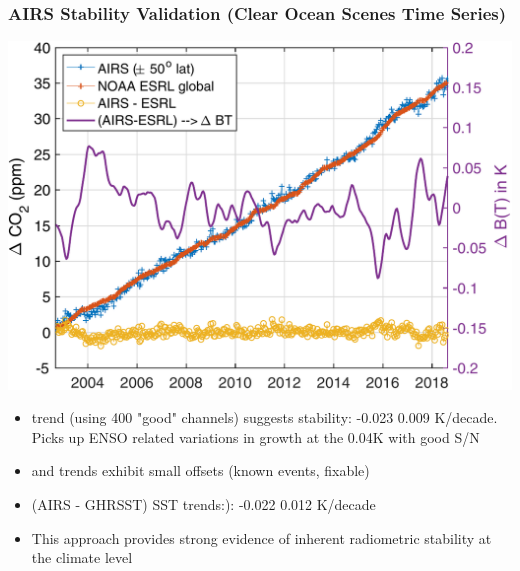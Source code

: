 \documentclass[10pt,t]{beamer}
\begin{document}
\begin{frame}
\frametitle{AIRS Stability Validation (Clear Ocean Scenes Time Series)}  
\vspace{-0.1in}
\begin{center}
\includegraphics[width=0.65\linewidth]{SunClimate2022/fig10.pdf}
\end{center}

\vspace{-0.05in}
\footnotesize
\begin{itemize}
\item \cd trend (using 400 "good" channels) suggests stability:  -0.023 \textpm{} 0.009 K/decade.  Picks up ENSO related variations in \cd growth at the 0.04K with good S/N
\item \methane and \nitrous trends exhibit small offsets (known events, fixable)
\item (AIRS - GHRSST) SST trends:):  -0.022 \textpm{} 0.012 K/decade
\item This approach provides strong evidence of inherent radiometric stability at the climate level
\end{itemize}
\end{frame}
\end{document}
